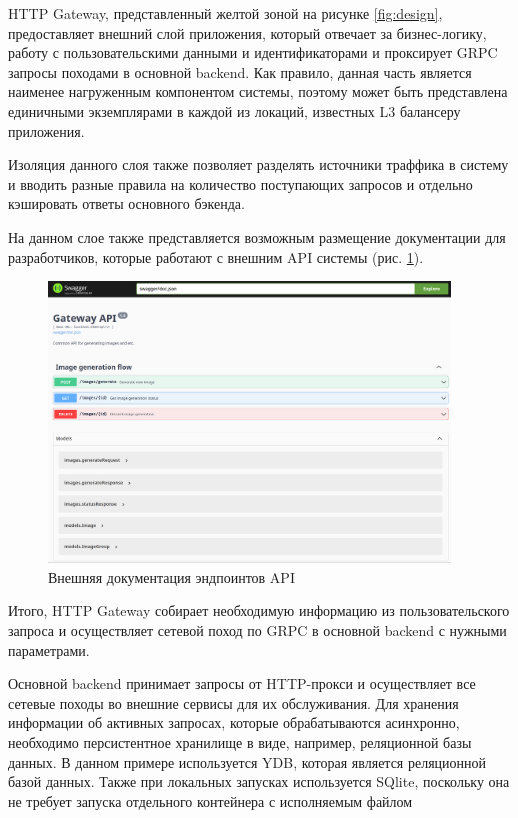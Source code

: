HTTP Gateway, представленный желтой зоной на рисунке \ref{fig:design}, предоставляет внешний слой приложения, который отвечает за бизнес-логику,
работу с пользовательскими данными и идентификаторами и проксирует GRPC запросы походами в основной backend.
Как правило, данная часть является наименее нагруженным компонентом системы, поэтому может быть 
представлена единичными экземплярами в каждой из локаций, известных L3 балансеру приложения.

Изоляция данного слоя также позволяет разделять источники траффика в систему и вводить разные
правила на количество поступающих запросов и отдельно кэшировать ответы основного бэкенда.

На данном слое также представляется возможным размещение документации для разработчиков, которые работают
с внешним API системы (рис. \ref{fig:swag}).

\begin{footnotesize}
\begin{figure}[H]
  \centering
  \includegraphics[width=0.95\textwidth]{img/swag.png}
  \caption{Внешняя документация эндпоинтов API}
    \label{fig:swag}
\end{figure}
\end{footnotesize}

Итого, HTTP Gateway собирает необходимую информацию из пользовательского запроса и осуществляет сетевой
поход по GRPC в основной backend с нужными параметрами.

Основной backend принимает запросы от HTTP-прокси и осуществляет все сетевые походы во внешние сервисы для
их обслуживания. Для хранения информации об активных запросах, которые обрабатываются асинхронно, необходимо персистентное 
хранилище в виде, например, реляционной базы данных. В данном примере используется YDB, которая является реляционной базой данных.
Также при локальных запусках используется SQlite, поскольку она не требует запуска отдельного контейнера
с исполняемым файлом

